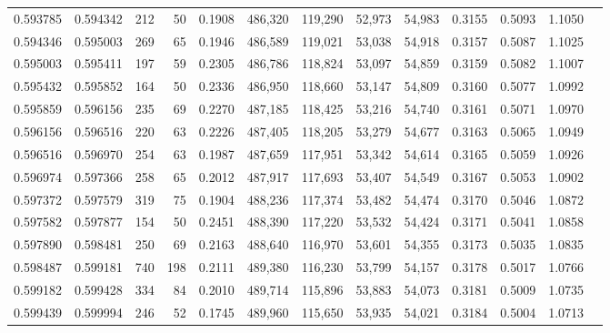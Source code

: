 \begin{tabular}{rrrrrrrrrrrrr}
0.593785 & 0.594342 &   212 &  50 &                                     0.1908 & 486,320 & 119,290 &  52,973 &  54,983 & 0.3155 & 0.5093 & 1.1050 \\
0.594346 & 0.595003 &   269 &  65 &                                     0.1946 & 486,589 & 119,021 &  53,038 &  54,918 & 0.3157 & 0.5087 & 1.1025 \\
0.595003 & 0.595411 &   197 &  59 &                                     0.2305 & 486,786 & 118,824 &  53,097 &  54,859 & 0.3159 & 0.5082 & 1.1007 \\
0.595432 & 0.595852 &   164 &  50 &                                     0.2336 & 486,950 & 118,660 &  53,147 &  54,809 & 0.3160 & 0.5077 & 1.0992 \\
0.595859 & 0.596156 &   235 &  69 &                                     0.2270 & 487,185 & 118,425 &  53,216 &  54,740 & 0.3161 & 0.5071 & 1.0970 \\
0.596156 & 0.596516 &   220 &  63 &                                     0.2226 & 487,405 & 118,205 &  53,279 &  54,677 & 0.3163 & 0.5065 & 1.0949 \\
0.596516 & 0.596970 &   254 &  63 &                                     0.1987 & 487,659 & 117,951 &  53,342 &  54,614 & 0.3165 & 0.5059 & 1.0926 \\
0.596974 & 0.597366 &   258 &  65 &                                     0.2012 & 487,917 & 117,693 &  53,407 &  54,549 & 0.3167 & 0.5053 & 1.0902 \\
0.597372 & 0.597579 &   319 &  75 &                                     0.1904 & 488,236 & 117,374 &  53,482 &  54,474 & 0.3170 & 0.5046 & 1.0872 \\
0.597582 & 0.597877 &   154 &  50 &                                     0.2451 & 488,390 & 117,220 &  53,532 &  54,424 & 0.3171 & 0.5041 & 1.0858 \\
0.597890 & 0.598481 &   250 &  69 &                                     0.2163 & 488,640 & 116,970 &  53,601 &  54,355 & 0.3173 & 0.5035 & 1.0835 \\
0.598487 & 0.599181 &   740 & 198 &                                     0.2111 & 489,380 & 116,230 &  53,799 &  54,157 & 0.3178 & 0.5017 & 1.0766 \\
0.599182 & 0.599428 &   334 &  84 &                                     0.2010 & 489,714 & 115,896 &  53,883 &  54,073 & 0.3181 & 0.5009 & 1.0735 \\
0.599439 & 0.599994 &   246 &  52 &                                     0.1745 & 489,960 & 115,650 &  53,935 &  54,021 & 0.3184 & 0.5004 & 1.0713 \\

\end{tabular}
